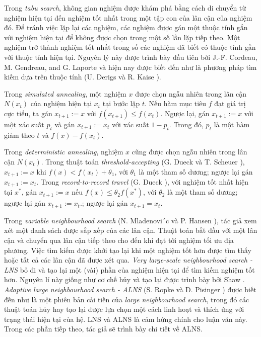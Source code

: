 Trong \textit{tabu search}, không gian nghiệm được khám phá bằng cách di chuyển từ nghiệm hiện tại đến nghiệm tốt nhất trong một tập con của lân cận của nghiệm đó. Để tránh việc lặp lại các nghiệm, các nghiệm được gán một thuộc tính gắn với nghiệm hiện tại để không được chọn trong một số lần lặp tiếp theo. Một nghiệm trở thành nghiệm tốt nhất trong số các nghiệm đã biết có thuộc tính gắn với thuộc tính hiện tại. Nguyên lý này được trình bày đầu tiên bởi J.-F. Cordeau, M. Gendreau, and G. Laporte \cite{cordeau1997tabu} và hiện nay được biết đến như là phương pháp tìm kiếm dựa trên thuộc tính (U. Derigs và R. Kaise \cite{derigs2007applying}).

Trong \textit{simulated annealing}, một nghiệm $x$ được chọn ngẫu nhiên trong lân cận $N(x_t)$ của nghiệm hiện tại $x_t$ tại bước lặp $t$. Nếu hàm mục tiêu $f$ đạt giá trị cực tiểu, ta gán $x_{t+1}:=x$ với $f(x_{t+1}) \leq f(x_t)$. Ngược lại, gán $x_{t+1}:=x$ với một xác suất $p_t$ và gán $x_{t+1}:=x_t$ với xác suất $1-p_t$. Trong đó, $p_t$ là một hàm giảm theo $t$ và $f(x) - f(x_t)$.

Trong \textit{deterministic annealing}, nghiệm $x$ cũng được chọn ngẫu nhiên trong lân cận $N(x_t)$. Trong thuật toán \textit{threshold-accepting} (G. Dueck và T. Scheuer \cite{dueck1990threshold}), $x_{t+1}:=x$ khi $f(x) < f(x_t) + \theta_1$, với $\theta_1$ là một tham số dương; ngược lại gán $x_{t+1}:=x_t$. Trong \textit{record-to-record travel} (G. Dueck \cite{dueck1993new}), với nghiệm tốt nhất hiện tại $x^*$, gán $x_{t+1}:=x$ nếu $f(x) \leq \theta_2 f(x^*)$, với $\theta_2$ là một tham số dương; ngược lại gán $x_{t+1}:=x_t$.; ngược lại gán $x_{t+1}=x_t$.

Trong \textit{variable neighbourhood search} (N. Mladenovi´c và P. Hansen \cite{mladenovic1997variable}), tác giả xem xét một danh sách được sắp xếp của các lân cận. Thuật toán bắt đầu với một lân cận và chuyển qua lân cận tiếp theo cho đến khi đạt tới nghiệm tối ưu địa phương. Việc tìm kiếm được khởi tạo lại khi một nghiệm tốt hơn được tìm thấy hoặc tất cả các lân cận đã được xét qua. \textit{Very large-scale neighbourhood search - LNS} bỏ đi và tạo lại một (vài) phần của nghiệm hiện tại để tìm kiếm nghiệm tốt hơn. Nguyên lí này giống như cơ chế hủy và tạo lại được trình bày bởi Shaw \cite{shaw1998using}. \textit{Adaptive large neighbourhood search - ALNS} (S. Ropke và D. Pisinger \cite{ropke2006adaptive}) được biết đến như là một phiên bản cải tiến của \textit{large neighbourhood search}, trong đó các thuật toán hủy hay tạo lại được lựa chọn một cách linh hoạt và thích ứng với trạng thái hiện tại của hệ. LNS và ALNS là cảm hứng chính cho luận văn này. Trong các phần tiếp theo, tác giả sẽ trình bày chi tiết về ALNS.

